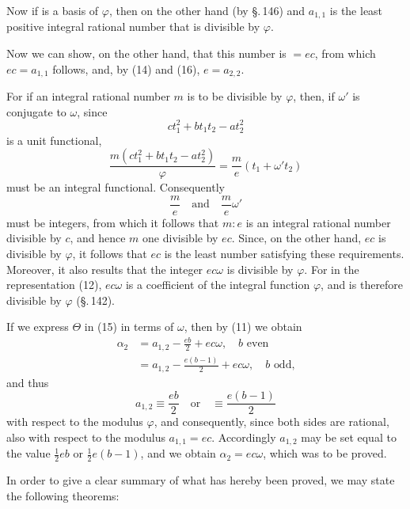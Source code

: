 Now if
is a basis of $\varphi$, then on the other hand (by \S.\,146)
and $a_{1,1}$ is the least positive integral rational number that is divisible by $\varphi$.

Now we can show, on the other hand, that this number is $= ec$, from which $ec = a_{1,1}$ follows, and, by (14) and (16), $e = a_{2,2}$.

For if an integral rational number $m$ is to be divisible by $\varphi$, then, if $\omega'$ is conjugate to $\omega$, since
\[
ct_1^2 + bt_1t_2 - at_2^2
\]
is a unit functional,
\[
\frac{m(ct_1^2+bt_1t_2-at_2^2)}{\varphi} = \frac{m}{e}(t_1+\omega' t_2)
\]
must be an integral functional. Consequently
\[
\frac{m}{e} \quad \text{and} \quad \frac{m}{e}\omega'
\]
must be integers, from which it follows that $m : e$ is an integral rational number divisible by $c$, and hence $m$ one divisible by $ec$. Since, on the other hand, $ec$ is divisible by $\varphi$, it follows that $ec$ is the least number satisfying these requirements. Moreover, it also results that the integer $ec\omega$ is divisible by $\varphi$. For in the representation (12), $ec\omega$ is a coefficient of the integral function $\varphi$, and is therefore divisible by $\varphi$ (\S.\,142).

If we express $\Theta$ in (15) in terms of $\omega$, then by (11) we obtain
\[
\begin{aligned}
\alpha_2 &= a_{1,2} - \frac{eb}{2} + ec\omega, \quad b \text{ even}\\
&= a_{1,2} - \frac{e(b-1)}{2} + ec\omega, \quad b \text{ odd,}
\end{aligned}
\]
and thus
\[
a_{1,2} \equiv \frac{eb}{2} \quad \text{or} \quad \equiv \frac{e(b-1)}{2}
\]
with respect to the modulus $\varphi$, and consequently, since both sides are rational, also with respect to the modulus $a_{1,1}=ec$. Accordingly $a_{1,2}$ may be set equal to the value $\frac{1}{2}eb$ or $\frac{1}{2}e(b-1)$, and we obtain $\alpha_2 = ec\omega$, which was to be proved.

In order to give a clear summary of what has hereby been proved, we may state the following theorems:
